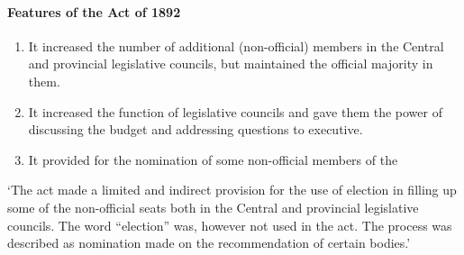 \begin{multicols}{2}
\paragraph{Features of the Act of 1892}
\begin{enumerate}
  \item It increased the number of additional (non-official) members in the Central and provincial legislative councils, but maintained the official majority in them.
  \item It increased the function of legislative councils and gave them the power of discussing the budget and addressing questions to executive.
  \item It provided for the nomination of some non-official members of the
\end{enumerate}
`The act made a limited and indirect provision for the use of election in filling up some of the non-official seats both in the Central and provincial legislative councils. The word ``election'' was, however not used in the act. The process was described as nomination made on the recommendation of certain bodies.'


\end{multicols}
